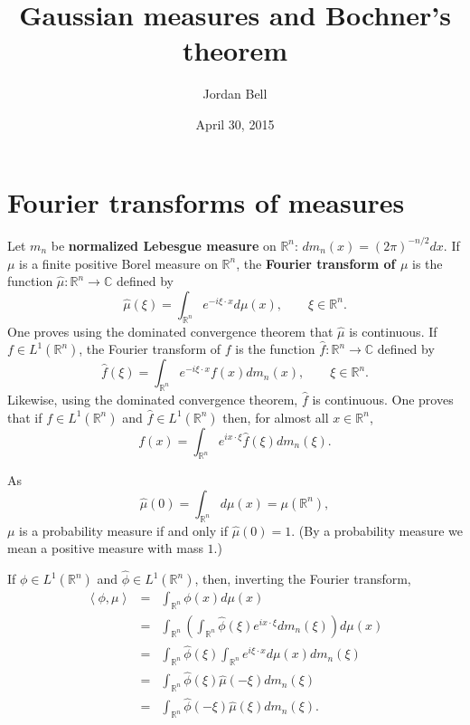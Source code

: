 \documentclass{article}
\newcommand{\inner}[2]{\left\langle #1, #2 \right\rangle}
\theoremstyle{definition}
\theoremstyle{definition}
\begin{document}
\title{Gaussian measures and Bochner's theorem}
\author{Jordan Bell}
\date{April 30, 2015}

\maketitle

\section{Fourier transforms of measures}
Let $m_n$ be \textbf{normalized Lebesgue measure} on $\mathbb{R}^n$: $dm_n(x) = (2\pi)^{-n/2} dx$. 
If $\mu$ is a finite  positive Borel  measure on $\mathbb{R}^n$, the \textbf{Fourier transform of $\mu$} is the function
$\hat{\mu}:\mathbb{R}^n \to \mathbb{C}$ defined by
\[
\hat{\mu}(\xi) = \int_{\mathbb{R}^n} e^{-i\xi \cdot x} d\mu(x), \qquad \xi \in \mathbb{R}^n.
\]
One proves using the dominated convergence theorem that $\hat{\mu}$ is continuous.
If $f \in L^1(\mathbb{R}^n)$, the Fourier transform of $f$ is the function $\hat{f}:\mathbb{R}^n \to \mathbb{C}$ defined by
\[
\hat{f}(\xi) = \int_{\mathbb{R}^n} e^{-i\xi\cdot x} f(x) dm_n(x), \qquad \xi \in \mathbb{R}^n.
\]
Likewise, using the dominated convergence theorem, $\hat{f}$ is continuous.
One proves that if $f \in L^1(\mathbb{R}^n)$ and $\hat{f} \in L^1(\mathbb{R}^n)$ then, for almost all $x \in \mathbb{R}^n$,
\[
f(x) = \int_{\mathbb{R}^n} e^{ix\cdot \xi} \hat{f}(\xi) dm_n(\xi).
\]

As
\[
\hat{\mu}(0)=\int_{\mathbb{R}^n} d\mu(x) = \mu(\mathbb{R}^n),
\]
$\mu$ is a probability measure if and only if $\hat{\mu}(0)=1$. (By a probability measure we mean a positive measure with mass $1$.)

If $\phi \in L^1(\mathbb{R}^n)$ and $\hat{\phi} \in L^1(\mathbb{R}^n)$, then, inverting the Fourier transform,
\begin{eqnarray*}
\inner{\phi}{\mu}&=&\int_{\mathbb{R}^n} \phi(x) d\mu(x)\\
&=&\int_{\mathbb{R}^n} \left(\int_{\mathbb{R}^n} \hat{\phi}(\xi) e^{ix\cdot \xi} dm_n(\xi) \right) d\mu(x)\\
&=& \int_{\mathbb{R}^n} \hat{\phi}(\xi) \int_{\mathbb{R}^n} e^{i\xi \cdot x} d\mu(x) dm_n(\xi)\\
&=&\int_{\mathbb{R}^n} \hat{\phi}(\xi) \hat{\mu}(-\xi) dm_n(\xi)\\
&=&\int_{\mathbb{R}^n} \hat{\phi}(-\xi) \hat{\mu}(\xi) dm_n(\xi).
\end{eqnarray*}
\end{document}
